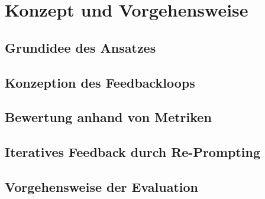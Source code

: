 \chapter{Konzept und Vorgehensweise}\label{ch:konzeption}


\section{Grundidee des Ansatzes}


\section{Konzeption des Feedbackloops}


\section{Bewertung anhand von Metriken}


\section{Iteratives Feedback durch Re-Prompting}


\section{Vorgehensweise der Evaluation}
